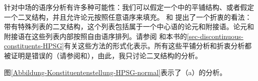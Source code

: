 针对中场的语序分析有许多种可能性：我们可以假定一个\gpsgc 中的平铺结构\citep{Kasper94a}、或者假定一个二叉结构，并且允许论元按照任意语序来填充。 \citet{Kathol2001a}和 \citet{Mueller99a,Mueller2002b,Mueller2004b}提出了一个折衷的看法：带有特殊列表的二叉结构，这个列表包括属于一个中心语的论元和附接语。论元和附接语在这些列表内部按照自由语序排列。请参阅 和本书的\ref{sec-discontinuous-constituents-HPSG}有关这些方法的形式化表示。所有这些平铺分析和折衷分析都被证明是错误的（请参阅\citealp{Mueller2005c,Mueller2004e}和\citealp[Section~9.5.1]{MuellerLehrbuch1}），由此，我只讨论二叉结构的分析。

图\vref{Abbildung-Konstituentenstellung-HPSG-normal}表示了（a）的分析。

